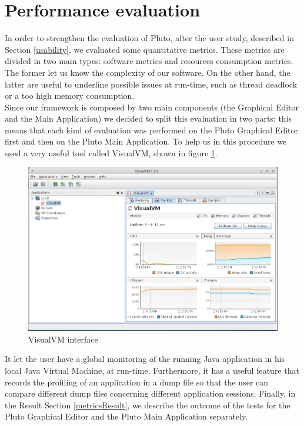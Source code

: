 \newpage

\section{Performance evaluation}\label{performance}

In order to strengthen the evaluation of Pluto, after the user study, described in Section \ref{usability}, we evaluated some quantitative metrics. These metrics are divided in two main types: software metrics and resources consumption metrics. The former let us know the complexity of our software.
On the other hand, the latter are useful to underline possible issues at run-time, such as thread deadlock or a too high memory consumption.
\\

Since our framework is composed by two main components (the Graphical Editor and the Main Application) we decided to split this evaluation in two parts: this means that each kind of evaluation was performed on the Pluto Graphical Editor first and then on the Pluto Main Application.
To help us in this procedure we used a very useful tool called VisualVM, shown in figure \ref{fig:visualVM}. 

\begin{figure}[H]
  \centering
  \includegraphics[width=\linewidth]{pictures/visualVM.png}
  \caption{VisualVM interface}
  \label{fig:visualVM}
\end{figure}

It let the user have a global monitoring of the running Java application in his local Java Virtual Machine, at run-time. Furthermore, it has a useful feature that records the profiling of an application in a dump file so that the user can compare different dump files concerning different application sessions.
Finally, in the Result Section \ref{metricsResult}, we describe the outcome of the tests for the Pluto Graphical Editor and the Pluto Main Application separately.

